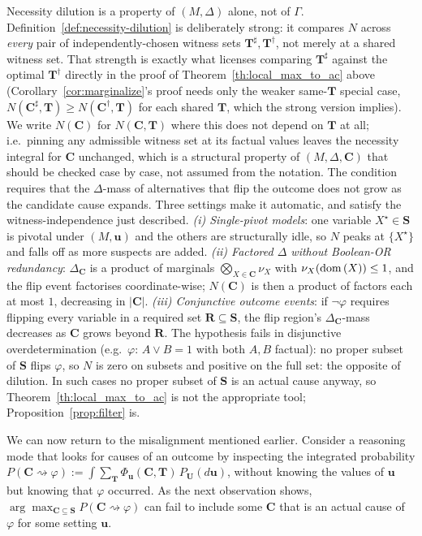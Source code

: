 \medskip\noindent Necessity dilution is a property of $(M,\Delta)$ alone, not of
$\Gamma$. Definition~\ref{def:necessity-dilution} is deliberately strong: it compares
$N$ across \emph{every} pair of independently-chosen witness sets
$\mathbf{T}^\sharp,\mathbf{T}^\dagger$, not merely at a shared witness set. That
strength is exactly what licenses comparing $\mathbf{T}^\sharp$ against the optimal
$\mathbf{T}^\dagger$ directly in the proof of Theorem~\ref{th:local_max_to_ac} above
(Corollary~\ref{cor:marginalize}'s proof needs only the weaker same-$\mathbf{T}$
special case, $N(\mathbf{C}^\sharp,\mathbf{T})\geq N(\mathbf{C}^\dagger,\mathbf{T})$
for each shared $\mathbf{T}$, which the strong version implies). We write
$N(\mathbf{C})$ for $N(\mathbf{C},\mathbf{T})$ where this does not depend on $\mathbf{T}$ at all; i.e.\ pinning any admissible witness set at its factual
values leaves the necessity integral for $\mathbf{C}$ unchanged, which is a
structural property of $(M,\Delta,\mathbf{C})$ that should be checked case by case,
not assumed from the notation. The condition requires that the $\Delta$-mass of alternatives that flip the outcome does not grow as the candidate cause expands. Three settings make it automatic, and satisfy the witness-independence just described. \emph{(i) Single-pivot models}: one variable $X^\star\in\mathbf{S}$
is pivotal under $(M,\mathbf{u})$ and the others are structurally idle, so $N$ peaks at
$\{X^\star\}$ and falls off as more suspects are added. \emph{(ii) Factored $\Delta$
without Boolean-OR redundancy}: $\Delta_{\mathbf{C}}$ is a product of marginals
$\bigotimes_{X\in\mathbf{C}}\nu_X$ with $\nu_X(\operatorname{dom}\,(X))\leq 1$, and the flip event
factorises coordinate-wise; $N(\mathbf{C})$ is then a product of factors each at most
$1$, decreasing in $|\mathbf{C}|$. \emph{(iii) Conjunctive outcome events}: if
$\neg\varphi$ requires flipping every variable in a required set
$\mathbf{R}\subseteq\mathbf{S}$, the flip region's $\Delta_{\mathbf{C}}$-mass decreases
as $\mathbf{C}$ grows beyond $\mathbf{R}$. The hypothesis fails in disjunctive
overdetermination (e.g.\ $\varphi:\,A\vee B=1$ with both $A,B$ factual): no proper
subset of $\mathbf{S}$ flips $\varphi$, so $N$ is zero on subsets and positive on the
full set: the opposite of dilution. In such cases no proper subset of $\mathbf{S}$
is an actual cause anyway, so Theorem~\ref{th:local_max_to_ac} is not the appropriate
tool; Proposition~\ref{prop:filter} is.

\medskip\noindent We can now return to the misalignment mentioned earlier. Consider a
reasoning mode that looks for causes of an outcome by inspecting
the integrated probability $P(\mathbf{C}\!\rightsquigarrow\!\varphi):=
\int\sum_{\mathbf{T}}\Phi_{\mathbf{u}}(\mathbf{C},\mathbf{T})\,P_{\mathbf{U}}(d\mathbf{u})$, without knowing
the values of $\mathbf{u}$ but knowing that $\varphi$ occurred. As the next observation
shows,
$\arg\max_{\mathbf{C}\subseteq\mathbf{S}} P(\mathbf{C}\!\rightsquigarrow\!\varphi)$
can fail to include some $\mathbf{C}$ that is an actual cause of $\varphi$ for some
setting $\mathbf{u}$.

